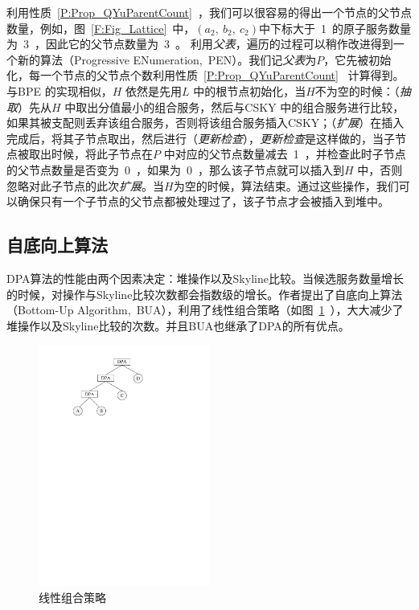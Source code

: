 利用性质~\ref{P:Prop_QYuParentCount}~，我们可以很容易的得出一个节点的父节点数量，例如，图~\ref{F:Fig_Lattice}~中，$(a_{2},\ b_{2},\ c_{2})$中下标大于~1~的原子服务数量为~3~，因此它的父节点数量为~3~。 利用\emph{父表}，遍历的过程可以稍作改进得到一个新的算法（Progressive ENumeration,~PEN）。我们记\emph{父表}为$P$，它先被初始化，每一个节点的父节点个数利用性质~\ref{P:Prop_QYuParentCount}~ 计算得到。与BPE 的实现相似，$H$ 依然是先用$L$ 中的根节点初始化，当$H$不为空的时候：（\emph{抽取}）先从$H$ 中取出分值最小的组合服务，然后与CSKY 中的组合服务进行比较，如果其被支配则丢弃该组合服务，否则将该组合服务插入CSKY；（\emph{扩展}）在插入完成后，将其子节点取出，然后进行（\emph{更新检查}），\emph{更新检查}是这样做的，当子节点被取出时候，将此子节点在$P$ 中对应的父节点数量减去~1~，并检查此时子节点的父节点数量是否变为~0~，如果为~0~，那么该子节点就可以插入到$H$ 中，否则忽略对此子节点的此次\emph{扩展}。当$H$为空的时候，算法结束。通过这些操作，我们可以确保只有一个子节点的父节点都被处理过了，该子节点才会被插入到堆中。

\subsection{自底向上算法}\label{S:SEC_BUA}

DPA算法的性能由两个因素决定：堆操作以及Skyline比较。当候选服务数量增长的时候，对操作与Skyline比较次数都会指数级的增长。作者提出了自底向上算法（Bottom-Up Algorithm,~BUA），利用了线性组合策略（如图~\ref{F:Fig_LinearComp}~），大大减少了堆操作以及Skyline比较的次数。并且BUA也继承了DPA的所有优点。

\begin{figure}[thb]
\centering
    \includegraphics[width=0.5\textwidth]{./FIGs/Fig_LinearComp.pdf}
\caption{线性组合策略}
\label{F:Fig_LinearComp}
\end{figure}

